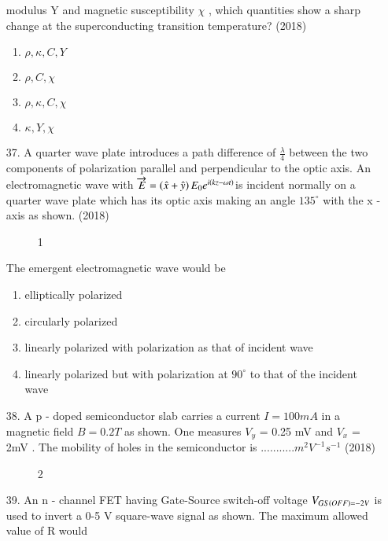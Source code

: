 \documentclass[journal]{IEEEtran}
\begin{document}
\begin{enumerate}
    modulus Y  and magnetic susceptibility $\chi$ , which quantities show a sharp change at
    the superconducting transition temperature?  \hfill (2018)
    \begin{enumerate} [label = (\Alph*)]
     \item $\rho, \kappa, C,Y$ 
     \item $\rho,C,\chi$
     \item $\rho, \kappa, C,\chi$
     \item $\kappa,Y,\chi$ 
    \end{enumerate}
    \item[37.] A quarter wave plate introduces a path difference of $\frac{\lambda}{4}$ between the two components
    of polarization parallel and perpendicular to the optic axis. An electromagnetic wave with $\overrightarrow{E}=\left(\hat{x}+\hat{y}\right)E_0e^{i\left(kz-\omega t\right)}$is incident normally on a quarter wave plate which has its optic axis
    making an angle $135^{\circ}$ with the x - axis as shown.  \hfill (2018)
    \begin{figure}[!ht]
        \centering
        \caption{1}
    \end{figure}
    The emergent electromagnetic wave would be 
    \begin{enumerate}[label=(\Alph*)]
        \item elliptically polarized 
        \item circularly polarized 
        \item  linearly polarized with polarization as that of incident wave 
        \item  linearly polarized but with polarization at $90^{\circ}$ to that of the incident wave 
    \end{enumerate}
    \item[38.]  A p - doped semiconductor slab carries a current $I=100mA$ in a magnetic field
    $B = 0.2T$ as shown. One measures $V_y$ = 0.25 mV and $V_x$ = 2mV . The mobility of holes
    in the semiconductor is ...........$m^2V^{-1}s^{-1}$ \hfill (2018)
    \begin{figure}[!ht]
        \centering
        \caption{2}
    \end{figure}
    \item[39.]  An n - channel FET having Gate-Source switch-off voltage $V_{GS\left(OFF\right) = -2V}$ is used to
    invert a 0-5 V square-wave signal as shown. The maximum allowed value of R would

\end{enumerate}
\end{document}
